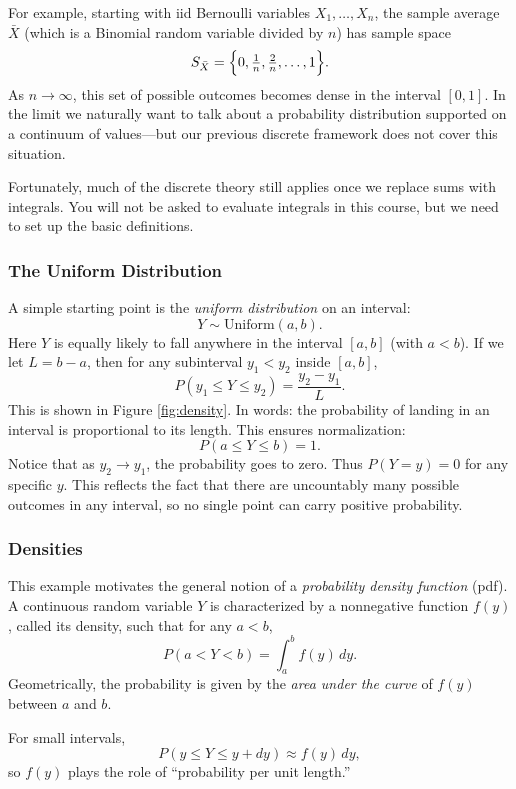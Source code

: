 For example, starting with iid Bernoulli variables $X_1,\dots,X_n$, the sample average $\bar{X}$ (which is a Binomial random variable divided by $n$)  has sample space 
\[
S_{\bar{X}} = \Bigl\{0,\tfrac{1}{n},\tfrac{2}{n},\dots,1\Bigr\}.
\]  
As \(n \to \infty\), this set of possible outcomes becomes dense in the interval \([0,1]\). In the limit we naturally want to talk about a probability distribution supported on a continuum of values---but our previous discrete framework does not cover this situation.  

Fortunately, much of the discrete theory still applies once we replace sums with integrals. You will not be asked to evaluate integrals in this course, but we need to set up the basic definitions.  



\subsubsection*{The Uniform Distribution}

A simple starting point is the \emph{uniform distribution} on an interval:  
\[
Y \sim \text{Uniform}(a,b).
\]  
Here \(Y\) is equally likely to fall anywhere in the interval \([a,b]\) (with \(a<b\)). If we let \(L = b-a\), then for any subinterval \(y_1 < y_2\) inside \([a,b]\),  
\[
P(y_1 \le Y \le y_2) = \frac{y_2-y_1}{L}.
\]  
This is shown in Figure \ref{fig:density}. 
In words: the probability of landing in an interval is proportional to its length. This ensures normalization:  
\[
P(a \le Y \le b) = 1.
\]  
Notice that as \(y_2 \to y_1\), the probability goes to zero. Thus \(P(Y=y)=0\) for any specific \(y\). This reflects the fact that there are uncountably many possible outcomes in any interval, so no single point can carry positive probability.  



\subsubsection*{Densities}

This example motivates the general notion of a \emph{probability density function} (pdf). A continuous random variable \(Y\) is characterized by a nonnegative function \(f(y)\), called its density, such that for any \(a<b\),  
\[
P(a < Y < b) = \int_a^b f(y)\,dy.
\]  
Geometrically, the probability is given by the \emph{area under the curve} of \(f(y)\) between \(a\) and \(b\).  

For small intervals,  
\[
P(y \le Y \le y+dy) \approx f(y)\,dy,
\]  
so \(f(y)\) plays the role of ``probability per unit length.''  

